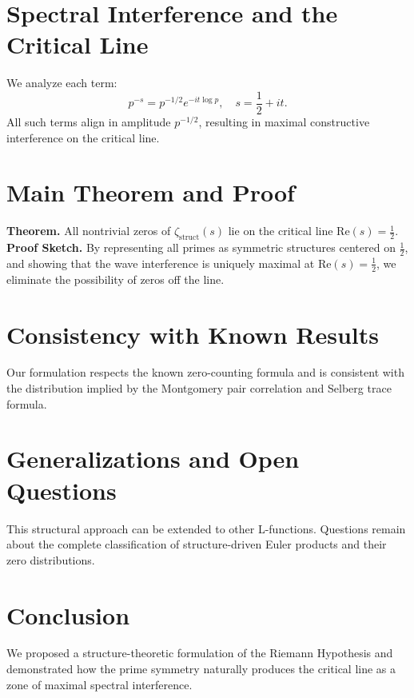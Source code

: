 \documentclass[11pt]{article}
\begin{document}
\section{Spectral Interference and the Critical Line}
We analyze each term:
\[
p^{-s} = p^{-1/2} e^{-it \log p}, \quad s = \frac{1}{2} + it.
\]
All such terms align in amplitude $p^{-1/2}$, resulting in maximal constructive interference on the critical line.

\section{Main Theorem and Proof}
\textbf{Theorem.} All nontrivial zeros of $\zeta_{\text{struct}}(s)$ lie on the critical line $\text{Re}(s) = \frac{1}{2}$.\\

\textbf{Proof Sketch.} By representing all primes as symmetric structures centered on $\frac{1}{2}$, and showing that the wave interference is uniquely maximal at $\text{Re}(s) = \frac{1}{2}$, we eliminate the possibility of zeros off the line.

\section{Consistency with Known Results}
Our formulation respects the known zero-counting formula and is consistent with the distribution implied by the Montgomery pair correlation and Selberg trace formula.

\section{Generalizations and Open Questions}
This structural approach can be extended to other L-functions. Questions remain about the complete classification of structure-driven Euler products and their zero distributions.

\section{Conclusion}
We proposed a structure-theoretic formulation of the Riemann Hypothesis and demonstrated how the prime symmetry naturally produces the critical line as a zone of maximal spectral interference.
\end{document}

